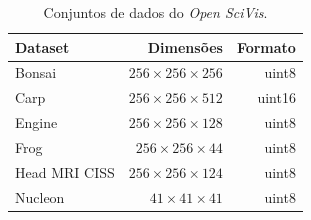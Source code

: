 \documentclass[12pt]{article}
\begin{document}
\begin{table}[ht]
\centering
\caption{Conjuntos de dados do \textit{Open SciVis}.}
\label{tab:openscivis}
\begin{tabular}{lrr}
\hline
\textbf{Dataset} & \textbf{Dimensões} & \textbf{Formato} \\ \hline
Bonsai           & $256 \times 256 \times 256$                & uint8       \\
Carp             & $256 \times 256 \times 512$                & uint16      \\ 
Engine           & $256 \times 256 \times 128$                & uint8       \\
Frog             & $256 \times 256 \times  44$                & uint8       \\
Head MRI CISS    & $256 \times 256 \times 124$                & uint8       \\
Nucleon          & $41  \times  41 \times  41$                & uint8       \\ 
\hline
\end{tabular}
\end{table}
\end{document}
